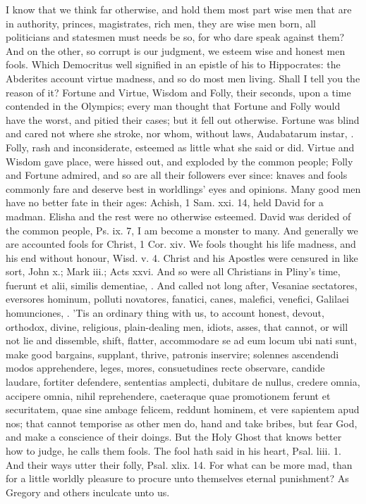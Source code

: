 {I know that we think far otherwise, and hold them most part wise men
that are in authority, princes, magistrates, rich men, they are
wise men born, all politicians and statesmen must needs be so, for who
dare speak against them? And on the other, so corrupt is our judgment,
we esteem wise and honest men fools. Which Democritus well signified in
an epistle of his to Hippocrates: the Abderites account virtue
madness, and so do most men living. Shall I tell you the reason of it?
Fortune and Virtue, Wisdom and Folly, their seconds, upon a time
contended in the Olympics; every man thought that Fortune and Folly
would have the worst, and pitied their cases; but it fell out
otherwise. Fortune was blind and cared not where she stroke, nor whom,
without laws, Audabatarum instar, \etc. Folly, rash and inconsiderate,
esteemed as little what she said or did. Virtue and Wisdom gave
place, were hissed out, and exploded by the common people; Folly
and Fortune admired, and so are all their followers ever since: knaves
and fools commonly fare and deserve best in worldlings' eyes and
opinions. Many good men have no better fate in their ages: Achish, 1
Sam. xxi. 14, held David for a madman. Elisha and the rest were no
otherwise esteemed. David was derided of the common people, Ps. ix. 7,
I am become a monster to many. And generally we are accounted fools for
Christ, 1 Cor. xiv. We fools thought his life madness, and his end
without honour, Wisd. v. 4. Christ and his Apostles were censured in
like sort, John x.; Mark iii.; Acts xxvi. And so were all Christians in
Pliny's time, fuerunt et alii, similis dementiae, \etc. And called
not long after, Vesaniae sectatores, eversores hominum, polluti
novatores, fanatici, canes, malefici, venefici, Galilaei homunciones,
\etc. 'Tis an ordinary thing with us, to account honest, devout,
orthodox, divine, religious, plain-dealing men, idiots, asses, that
cannot, or will not lie and dissemble, shift, flatter, accommodare se
ad eum locum ubi nati sunt, make good bargains, supplant, thrive,
patronis inservire; solennes ascendendi modos apprehendere, leges,
mores, consuetudines recte observare, candide laudare, fortiter
defendere, sententias amplecti, dubitare de nullus, credere omnia,
accipere omnia, nihil reprehendere, caeteraque quae promotionem ferunt
et securitatem, quae sine ambage felicem, reddunt hominem, et vere
sapientem apud nos; that cannot temporise as other men do, hand
and take bribes, \etc but fear God, and make a conscience of their
doings. But the Holy Ghost that knows better how to judge, he calls
them fools. The fool hath said in his heart, Psal. liii. 1. And their
ways utter their folly, Psal. xlix. 14. For what can be more mad,
than for a little worldly pleasure to procure unto themselves eternal
punishment? As Gregory and others inculcate unto us.

}
